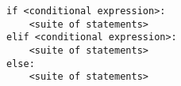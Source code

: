 \begin{lstlisting}
if <conditional expression>:
    <suite of statements>
elif <conditional expression>:
    <suite of statements>
else:
    <suite of statements>
\end{lstlisting}

